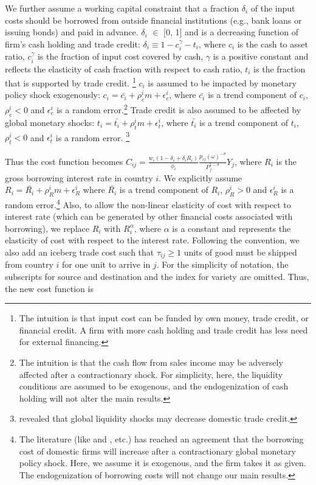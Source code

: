 We further assume a working capital constraint that a fraction $\delta_i$ of the input costs should be borrowed from outside financial institutions (e.g., bank loans or issuing bonds) and paid in advance. $\delta_i$ $\in$ [0, 1] and is a decreasing function of firm's cash holding and trade credit: $\delta_i \equiv 1-c_i^\gamma-t_i$, where $c_i$ is the cash to asset ratio, $c_i^\gamma$ is the fraction of input cost covered by cash, $\gamma$ is a positive constant and reflects the elasticity of cash fraction with respect to cash ratio, $t_i$ is the fraction that is supported by trade credit. \footnote{The intuition is that input cost can be funded by own money, trade credit, or financial credit. A firm with more cash holding and trade credit has less need for external financing.} $c_i$ is assumed to be impacted by monetary policy shock exogenously: $c_i=\bar{c_i}+\rho_c^i m+\epsilon_c^i$, where $\bar{c_i}$ is a trend component of $c_i$, $\rho_c^i<0$ and $\epsilon_c^i$ is a random error.\footnote{The intuition is that the cash flow from sales income may be adversely affected after a contractionary shock. For simplicity, here, the liquidity conditions are assumed to be exogenous, and the endogenization of cash holding will not alter the main results.} Trade credit is also assumed to be affected by global monetary shocks: $t_i=\bar{t_i}+\rho_t^i m+\epsilon_t^i$, where $\bar{t_i}$ is a trend component of $t_i$, $\rho_t^i<0$ and $\epsilon_t^i$ is a random error. \footnote{\cite{lin2018foreign} revealed that global liquidity shocks may decrease domestic trade credit.} 

Thus the cost function becomes $ C_{ij}=\frac{w_i(1-\delta_i+\delta_i R_i)}{\phi_i} \frac{p_{ij}(\omega)^{-\sigma}}{P_j^{1-\sigma}} Y_j$, where $R_i$ is the gross borrowing interest rate in country $i$. We explicitly assume $R_i=\bar{R_i}+\rho_R^i m+\epsilon_R^i$ where $\bar{R_i}$ is a trend component of $R_i$, $\rho_R^i>0$ and $\epsilon_R^i$ is a random error.\footnote{The literature (like \cite{georgiadis2016determinants} and \cite{miranda2020us}, etc.) has reached an agreement that the borrowing cost of domestic firms will increase after a contractionary global monetary policy shock. Here, we assume it is exogenous, and the firm takes it as given. The endogenization of borrowing costs will not change our main results.} Also, to allow the non-linear elasticity of cost with respect to interest rate (which can be generated by other financial costs associated with borrowing), we replace $R_i$ with $R_i^\alpha$, where $\alpha$ is a constant and represents the elasticity of cost with respect to the interest rate. Following the convention, we also add an iceberg trade cost such that $\tau_{ij}\geq1$ units of good must be shipped from country $i$ for one unit to arrive in $j$. For the simplicity of notation, the subscripts for source and destination and the index for variety are omitted. Thus, the new cost function is

